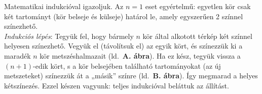 \begin{solution}
Matematikai indukcióval igazoljuk. Az $n=1$ eset egyértelmű: egyetlen
kör csak két tartományt (kör belseje és külseje) határol le, amely
egyszerűen 2 színnel színezhető.\\[6pt] \emph{Indukciós lépés}: Tegyük
fel, hogy bármely $n$ kör által alkotott térkép két színnel helyesen
színezhető. Vegyük el (távolítsuk el) az egyik kört, és színezzük
ki a maradék $n$ kör metszéshalmazait (ld.\ \textbf{A. ábra}). Ha
ez kész, tegyük vissza a $(n+1)$-edik kört, s a kör belsejében található
tartományokat (az új metszeteket) színezzük át a „másik” színre (ld.\ \textbf{B.
ábra}). Így megmarad a helyes kétszínezés. Ezzel készen vagyunk: teljes
indukcióval beláttuk az állítást. \quad{}

\vspace{1em}
\begin{center}
\begin{minipage}[c]{0.45\textwidth}%
\end{minipage}
\end{center}
\end{solution}
